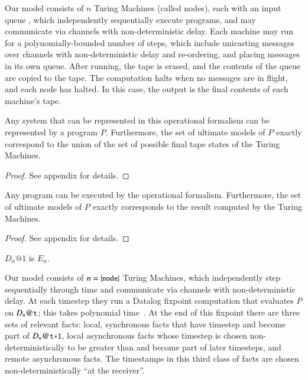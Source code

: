 
Our model consists of $n$ Turing Machines (called nodes), each with an input queue , which independently sequentially execute programs, and may communicate via channels with non-deterministic  delay.  Each machine may run for a polynomially-bounded number of steps, which include unicasting  messages over channels  with non-deterministic delay and re-ordering, and placing messages in its own queue.  After running, the tape is erased, and the contents of the queue are copied to the tape.  The computation halts when no messages are in flight, and each node has halted.  In this case, the output is the final contents of each machine's tape.

\begin{lemma}
\label{lem:turing2dedalus}
Any system that can be represented in this operational formalism can be represented by a \lang program $P$.  Furthermore, the set of ultimate models of $P$ exactly correspond to the union of the set of possible final tape states of the Turing Machines.
\end{lemma}
\begin{proof}
See appendix for details.
\end{proof}


\begin{lemma}
\label{lem:dedalus2turing}
Any \lang program can be executed by the operational formalism.  Furthermore, the set of ultimate models of $P$ exactly corresponds to the result computed by the Turing Machines.
\end{lemma}
\begin{proof}
See appendix for details.
\end{proof}

$D_n@1$ is $E_n$.  

Our model consists of $n = |\dedalus{node}|$ Turing Machines, which independently step sequentially through time and communicate via channels with non-deterministic delay.  At each timestep  they run a Datalog fixpoint computation that evaluates $P$ on $D_n@\dedalus{t}$; this takes polynomial time~\cite{immerman-ptime, vardi-ptime}.  At the end of this fixpoint there are three sets of relevant facts: local, synchronous facts that have timestep  and become part of $D_n@\dedalus{t+1}$, local asynchronous facts whose timestep is chosen non-deterministically to be greater than  and become part of later timesteps, and remote asynchronous facts.  The timestamps in this third class of facts are chosen non-deterministically ``at the receiver''.

